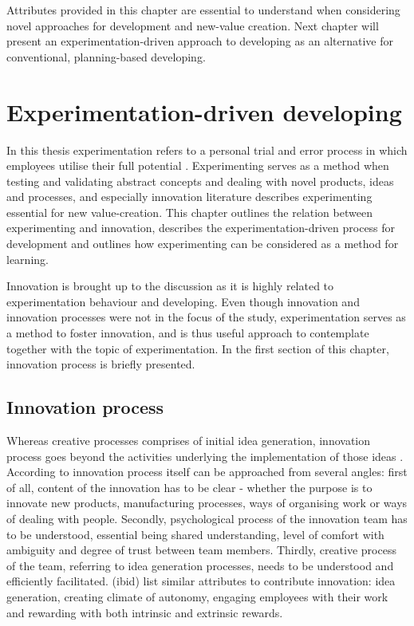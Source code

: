Attributes provided in this chapter are essential to understand when considering novel approaches for development and new-value creation. Next chapter will present an experimentation-driven approach to developing as an alternative for conventional, planning-based developing. 
 
\chapter{Experimentation-driven developing}
In this thesis experimentation refers to a personal trial and error process in which employees utilise their full potential \citep{andriopoulos2000enhancing}. Experimenting serves as a method when testing and validating abstract concepts \citep{kolb1984experiential} and dealing with novel products, ideas and processes, and especially innovation literature describes experimenting essential for new value-creation. This chapter outlines the relation between experimenting and innovation, describes the experimentation-driven process for development and outlines how experimenting can be considered as a method for learning. 

Innovation is brought up to the discussion as it is highly related to experimentation behaviour and developing. Even though innovation and innovation processes were not in the focus of the study, experimentation serves as a method to foster innovation, and is thus useful approach to contemplate together with the topic of experimentation. In the first section of this chapter, innovation process is briefly presented. 

\section{Innovation process}
Whereas creative processes comprises of initial idea generation, innovation process goes beyond the activities underlying the implementation of those ideas \citep{vincent2002divergent}. According to \citet{bujis2007innovation} innovation process itself can be approached from several angles: first of all, content of the innovation has to be clear - whether the purpose is to innovate new products, manufacturing processes, ways of organising work or ways of dealing with people. Secondly, psychological process of the innovation team has to be understood, essential being shared understanding, level of comfort with ambiguity and degree of trust between team members. Thirdly, creative process of the team, referring to idea generation processes, needs to be understood and efficiently facilitated. (ibid) \citet{amabile1996assessing} list similar attributes to contribute innovation: idea generation, creating climate of autonomy, engaging employees with their work and rewarding with both intrinsic and extrinsic rewards. 

